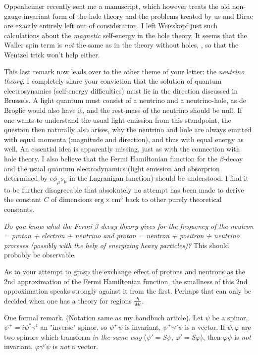 \documentclass{article}
\begin{document}
Oppenheimer recently sent me a manuscript, which however treats the old non-gauge-invariant form of the hole theory and the problems treated by us and Dirac are exactly entirely left out of consideration. I left Weisskopf just such calculations about the \textit{magnetic} self-energy in the hole theory. It seems that the Waller spin term is \textit{not} the same as in the theory without holes, , so that the Wentzel trick won't help either.

This last remark now leads over to the other theme of your letter: the \textit{neutrino theory}. I completely share your conviction that the solution of quantum electrosynamics (self-energy difficulties) must lie in the direction discussed in Brussels. A light quantum must consist of a neutrino and a neutrino-hole, as de Broglie would also have it, and the rest-mass of the neutrino should be null. If one wants to understand the usual light-emission from this standpoint, the question then naturally also arises, why the neutrino and hole are always emitted with equal momenta (magnitude and direction), and thus with equal energy as well. An essential idea is apparently missing, just as with the connection with hole theory. I also believe that the Fermi Hamiltonian function for the $\beta$-decay and the usual quantum electrodynamics (light emission and absorprion determined by $e \phi_\mu s_\mu$ in the Lagranigan function) should be  understood. I find it to be further disagreeable that absokutely no attempt has been made to derive the  constant $C$ of dimensions $\text{erg}\times\text{cm}^3$ back to other purely theoretical constants.

\textit{Do you know what the Fermi $\beta$-decay theory gives for the frequency of the neutron = proton + electron + neutrino and proton = neutron + positron + neutrino proceses (possibly with the help of energizing heavy particles)?} This should probably be observable.

As to your attempt to grasp the exchange effect of protons and neutrons as the 2nd approximation of the Fermi Hamiltonian function, the smallness of this 2nd approximation speaks strongly against it from the first. Perhaps that can only be decided when one has a theory for regions $\frac{\hbar}{Mc}$.

One formal remark. (Notation same as my handbuch article). Let $\psi$ be a spinor, $\psi^+ = i\psi^* \gamma^4$ an "inverse" spinor, so $\psi^+ \psi$ is invariant, $\psi^+ \gamma^\nu \psi$ is a vector. If $\psi,\varphi$ are two spinors which transform \textit{in the same way} ($\psi' = S\psi$, $\varphi' = S\varphi$), then $\varphi\psi$ is \textit{not} invariant, $\varphi\gamma^\nu \psi$ is \textit{not} a vector.
\end{document}

